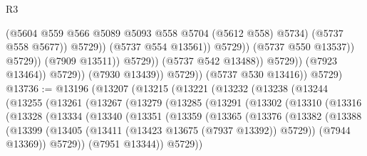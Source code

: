 \begin{lexlean}{R3}
\begin{coremodule}
                                                  (@5604
                                                    @559
                                                    @566
                                                    @5089
                                                    @5093
                                                    @558
                                                    @5704
                                                    (@5612 @558)
                                                    @5734)
                                                  (@5737 @558 @5677))
                                                @5729))
                                            (@5737 @554 @13561))
                                          @5729))
                                      (@5737 @550 @13537))
                                    @5729))
                                (@7909 @13511))
                              @5729))
                          (@5737 @542 @13488))
                        @5729))
                    (@7923 @13464))
                  @5729))
              (@7930 @13439))
            @5729))
        (@5737 @530 @13416))
      @5729)
@13736 := @13196
    (@13207
      (@13215
        (@13221
          (@13232
            (@13238
              (@13244
                (@13255
                  (@13261
                    (@13267
                      (@13279
                        (@13285
                          (@13291
                            (@13302
                              (@13310
                                (@13316
                                  (@13328
                                    (@13334
                                      (@13340
                                        (@13351
                                          (@13359
                                            (@13365
                                              (@13376
                                                (@13382
                                                  (@13388
                                                    (@13399
                                                      (@13405
                                                        (@13411
                                                          (@13423 @13675 (@7937 @13392))
                                                          @5729))
                                                      (@7944 @13369))
                                                    @5729))
                                                (@7951 @13344))
                                              @5729))

\end{coremodule}
\end{lexlean}
